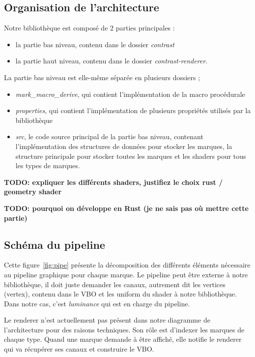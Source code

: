 \documentclass[12pt]{article}
\begin{document}
\subsection{Organisation de l'architecture}

Notre bibliothèque est composé de 2 parties principales :
\begin{itemize}
\item la partie bas niveau, contenu dans le dossier \textit{contrast}
\item la partie haut niveau, contenu dans le dossier  \textit{contrast-renderer}.
\end{itemize}

La partie bas niveau est elle-même séparée en plusieurs dossiers ;
\begin{itemize}
\item \textit{mark\_macro\_derive}, qui contient l'implémentation de la macro procédurale
\item \textit{properties}, qui contient l'implémentation de plusieurs propriétés utilisés par la bibliothèque
\item \textit{src}, le code source principal de la partie bas niveau, contenant l'implémentation des structures de données pour stocker les marques, la structure principale pour stocker toutes les marques et les shaders pour tous les types de marques.
\end{itemize}

\textbf{TODO: expliquer les différents shaders, justifiez le choix rust / geometry shader}

\textbf{TODO: pourquoi on développe en Rust (je ne sais pas où mettre cette partie)}

\subsection{Schéma du pipeline}

Cette figure~\ref{fig:pipe} présente la décomposition des différents éléments nécessaire au \gls{pipeline}
graphique pour chaque marque. Le pipeline peut être externe à notre bibliothèque, il doit juste demander
les canaux, autrement dit les vertices (\gls{vertex}), contenu dans le \gls{VBO} et les \gls{uniform}
du \gls{shader} à notre bibliothèque\cite{Semi}.
Dans notre cas, c'est \textit{luminance} \cite{luminance} qui est en charge du pipeline.

Le renderer n'est actuellement pas présent dans notre diagramme de l'architecture pour des
raisons techniques. Son rôle est d'indexer les marques de chaque type. Quand une marque demande
à être affiché, elle notifie le renderer qui va récupérer ses canaux et construire le VBO.
\end{document}
